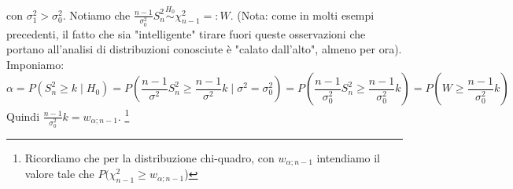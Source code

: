 con $\sigma_1^2 > \sigma_0^2$.
Notiamo che $\frac{n-1}{\sigma_0^2} S_n^2 \stackrel{H_0}{\sim} \chi_{n-1}^2 =: W$. (Nota: come in molti esempi precedenti, il fatto che sia "intelligente" tirare fuori queste osservazioni che portano all'analisi di distribuzioni conosciute è "calato dall'alto", almeno per ora).\\
Imponiamo:
$$\alpha = P(S_n^2 \geq k \mid H_0) = P \left( \frac{n-1}{\sigma^2} S_n^2 \geq \frac{n-1}{\sigma^2} k \mid \sigma^2=\sigma_0^2 \right) = P \left( \frac{n-1}{\sigma_0^2} S_n^2 \geq \frac{n-1}{\sigma_0^2} k \right) = P \left( W \geq \frac{n-1}{\sigma_0^2} k \right)$$
Quindi $\frac{n-1}{\sigma_0^2} k =w_{\alpha;n-1}$. \footnote{Ricordiamo che per la distribuzione chi-quadro, con $w_{\alpha;n-1}$ intendiamo il valore tale che $P(\chi_{n-1}^2 \geq w_{\alpha;n-1}$)} 

